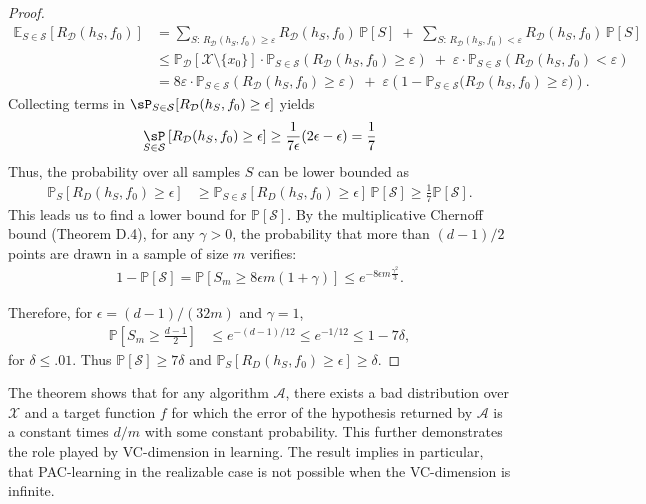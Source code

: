 \begin{proof}
\begin{align}
\mathbb{E}_{S\in\mathcal S}[R_{\mathcal D}(h_S,f_0)]
&= \sum_{S:\,R_{\mathcal D}(h_S,f_0)\ge\varepsilon} R_{\mathcal D}(h_S,f_0)\,\mathbb{P}[S]
\;+\; \sum_{S:\,R_{\mathcal D}(h_S,f_0)<\varepsilon} R_{\mathcal D}(h_S,f_0)\,\mathbb{P}[S] \\
&\le \mathbb{P}_{\mathcal D}[\mathcal X\setminus\{x_0\}]\cdot \mathbb{P}_{S\in\mathcal S}\left(R_{\mathcal D}(h_S,f_0)\ge\varepsilon\right)
\;+\; \varepsilon\cdot \mathbb{P}_{S\in\mathcal S}\left(R_{\mathcal D}(h_S,f_0)<\varepsilon\right) \\
&= 8\varepsilon\cdot \mathbb{P}_{S\in\mathcal S}\left(R_{\mathcal D}(h_S,f_0)\ge\varepsilon\right)
\;+\; \varepsilon\left(1-\mathbb{P}_{S\in\mathcal S}\bigl(R_{\mathcal D}(h_S,f_0)\ge\varepsilon\bigr)\right).
\end{align}
Collecting terms in $\sP_{S\in\mathcal{S}}[R_{\mathcal{D}}(h_{S},f_{0})\geq \epsilon]$ yields
\begin{equation}
    \underset{S\in\mathcal{S}}{\sP}\left[R_{\mathcal{D}}(h_{S},f_0)\geq \epsilon\right] \geq \frac{1}{7\epsilon} (2\epsilon - \epsilon) = \frac{1}{7}
\end{equation}
Thus, the probability over all samples $S$ can be lower bounded as 
\begin{align}
\mathbb{P}_{S}[R_{D}(h_{S}, f_{0}) \geq \epsilon] 
&\geq \mathbb{P}_{S \in \mathcal{S}}[R_{D}(h_{S}, f_{0}) \geq \epsilon] \, \mathbb{P}[\mathcal{S}] 
\geq \tfrac{1}{7}\mathbb{P}[\mathcal{S}]. 
\end{align}
This leads us to find a lower bound for $\mathbb{P}[\mathcal{S}]$. 
By the multiplicative Chernoff bound (Theorem D.4), for any $\gamma > 0$, 
the probability that more than $(d-1)/2$ points are drawn in a sample of size $m$ verifies:
\begin{align}
1 - \mathbb{P}[\mathcal{S}] 
= \mathbb{P}[S_{m} \geq 8 \epsilon m (1 + \gamma)] 
\leq e^{-8 \epsilon m \frac{\gamma^{2}}{3}}. 
\end{align}

Therefore, for $\epsilon = (d-1)/(32m)$ and $\gamma = 1$,
\begin{align}
\mathbb{P}[S_{m} \geq \tfrac{d-1}{2}] 
&\leq e^{-(d-1)/12} 
\leq e^{-1/12} 
\leq 1 - 7\delta, 
\end{align}
for $\delta \leq .01$. Thus $\mathbb{P}[\mathcal{S}] \geq 7\delta$ and $\mathbb{P}_{S}[R_{D}(h_{S}, f_{0}) \geq \epsilon] \geq \delta$. 
\end{proof}
The theorem shows that for any algorithm $\mathcal{A}$, there exists a bad distribution over $\mathcal{X}$ and a target function $f$ for which the error of the hypothesis returned by $\mathcal{A}$ is a constant times $d/m$ with some constant probability. This further demonstrates the role played by VC-dimension in learning. The result implies in particular, that PAC-learning in the realizable case is not possible when the VC-dimension is infinite. 

